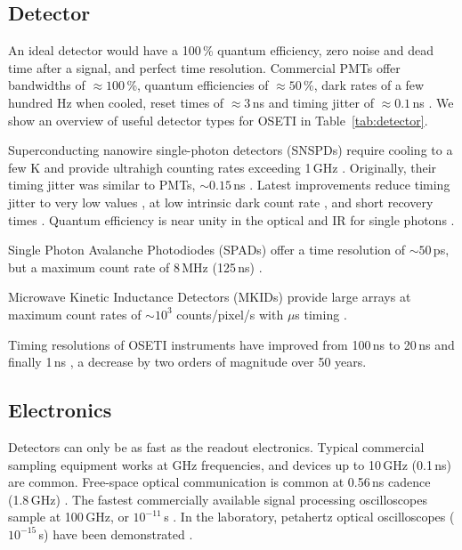\documentclass[twocolumn,tighten,longauthor]{myaastex62}
\begin{document}
\subsection{Detector}
\label{sub:detector}
An ideal detector would have a 100\,\% quantum efficiency, zero noise and dead time after a signal, and perfect time resolution. Commercial PMTs offer bandwidths of $\approx100\,$\%, quantum efficiencies of $\approx50\,$\%, dark rates of a few hundred Hz when cooled, reset times of $\approx3\,$ns and timing jitter of $\approx0.1\,$ns \citep{2010NIMPA.618..139A}. We show an overview of useful detector types for OSETI in Table~\ref{tab:detector}.

Superconducting nanowire single-photon detectors (SNSPDs) require cooling to a few K \citep{JinZhang2003} and provide ultrahigh counting rates exceeding 1\,GHz \citep{2008ApPhL..92x1112T}. Originally, their timing jitter was similar to PMTs, $\sim0.15$\,ns \citep{2001ApPhL..79..705G,2013NaPho...7..210M}. Latest improvements reduce timing jitter to very low values \citep[$<18$\,ps FWHM,][]{Shcheslavskiy2016}, at low intrinsic dark count rate \citep[$\ll$\,kHz,][]{2017SuScT..30kLT01G}, and short recovery times \citep[$<20\,$ns,][]{2017SuScT..30kLT01G}. Quantum efficiency is near unity in the optical and IR for single photons \citep[93\,\%,][]{2013NaPho...7..210M}.

Single Photon Avalanche Photodiodes (SPADs) offer a time resolution of $\sim50\,$ps, but a maximum count rate of 8\,MHz (125\,ns) \citep{2009JMOp...56..273B,2015SPIE.9504E..0CZ}.

Microwave Kinetic Inductance Detectors (MKIDs) provide large arrays at maximum count rates of $\sim10^3$ counts/pixel/s with $\mu$s timing \citep{2012RScI...83d4702M,2012OExpr..20.1503M}.

Timing resolutions of OSETI instruments have improved from 100\,ns \citep{1977SoSAO..19....5S} to 20\,ns \citep[][]{1997A&AT...13...13S} and finally 1\,ns \citep{2014SPIE.9147E..4KM}, a decrease by two orders of magnitude over 50 years.


\subsection{Electronics}
\label{sub:electronics}
Detectors can only be as fast as the readout electronics. Typical commercial sampling equipment works at GHz frequencies, and devices up to 10\,GHz (0.1\,ns) are common. Free-space optical communication is common at 0.56\,ns cadence (1.8\,GHz) \citep{Brandl2014,Ferraro2015}. The fastest commercially available signal processing oscilloscopes sample at 100\,GHz, or $10^{-11}\,$s \citep{2008Natur.456...81F,2012MeScT..23b5201F}. In the laboratory, petahertz optical oscilloscopes ($10^{-15}\,$s) have been demonstrated \citep{2013NaPho...7..958K}.
\end{document}
